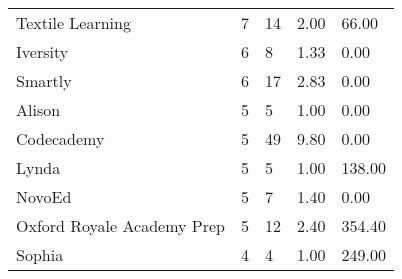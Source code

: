 \documentclass[
	a4paper,
	pdftex,
	12pt,	
	footinclude=true,
	fleqn,
	final,
	]{report}%
\begin{document}
\begin{table}[h]
{\begin{tabular}{m{7cm} m{2.3cm} m{2.3cm} m{2.3cm} m{2.3cm}}
Textile Learning              & 7                                                    & 14                                                    & 2.00                                                     & 66.00                                                    \\
Iversity                      & 6                                                    & 8                                                     & 1.33                                                     & 0.00                                                     \\
Smartly                       & 6                                                    & 17                                                    & 2.83                                                     & 0.00                                                     \\
Alison                        & 5                                                    & 5                                                     & 1.00                                                     & 0.00                                                     \\
Codecademy                    & 5                                                    & 49                                                    & 9.80                                                     & 0.00                                                     \\
Lynda                         & 5                                                    & 5                                                     & 1.00                                                     & 138.00                                                   \\
NovoEd                        & 5                                                    & 7                                                     & 1.40                                                     & 0.00                                                     \\
Oxford Royale Academy Prep    & 5                                                    & 12                                                    & 2.40                                                     & 354.40                                                   \\
Sophia                        & 4                                                    & 4                                                     & 1.00                                                     & 249.00                                                   \\

\end{tabular}}
\end{table}
\end{document}
